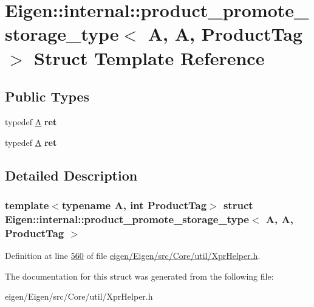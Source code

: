 \hypertarget{struct_eigen_1_1internal_1_1product__promote__storage__type_3_01_a_00_01_a_00_01_product_tag_01_4}{}\section{Eigen\+:\+:internal\+:\+:product\+\_\+promote\+\_\+storage\+\_\+type$<$ A, A, Product\+Tag $>$ Struct Template Reference}
\label{struct_eigen_1_1internal_1_1product__promote__storage__type_3_01_a_00_01_a_00_01_product_tag_01_4}
\subsection*{Public Types}
\begin{DoxyCompactItemize}
\item 
\mbox{\label{struct_eigen_1_1internal_1_1product__promote__storage__type_3_01_a_00_01_a_00_01_product_tag_01_4_a5cc1615a8e7ee8a6ddcb6078520b7886}} 
typedef \hyperlink{group___core___module_class_eigen_1_1_matrix}{A} {\bfseries ret}
\item 
\mbox{\label{struct_eigen_1_1internal_1_1product__promote__storage__type_3_01_a_00_01_a_00_01_product_tag_01_4_a5cc1615a8e7ee8a6ddcb6078520b7886}} 
typedef \hyperlink{group___core___module_class_eigen_1_1_matrix}{A} {\bfseries ret}
\end{DoxyCompactItemize}


\subsection{Detailed Description}
\subsubsection*{template$<$typename A, int Product\+Tag$>$\newline
struct Eigen\+::internal\+::product\+\_\+promote\+\_\+storage\+\_\+type$<$ A, A, Product\+Tag $>$}



Definition at line \hyperlink{eigen_2_eigen_2src_2_core_2util_2_xpr_helper_8h_source_l00560}{560} of file \hyperlink{eigen_2_eigen_2src_2_core_2util_2_xpr_helper_8h_source}{eigen/\+Eigen/src/\+Core/util/\+Xpr\+Helper.\+h}.



The documentation for this struct was generated from the following file\+:\begin{DoxyCompactItemize}
\item 
eigen/\+Eigen/src/\+Core/util/\+Xpr\+Helper.\+h\end{DoxyCompactItemize}
